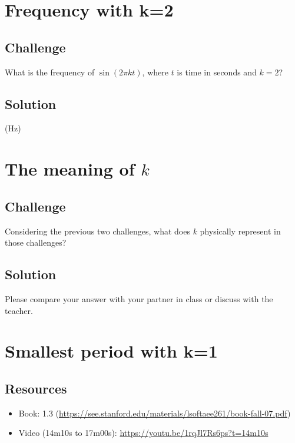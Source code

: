 



\newpage
\section{Frequency with k=2}

\subsection*{Challenge}
What is the frequency of $\sin(2 \pi k t)$, where $t$ is time in seconds and $k=2$?

\subsection*{Solution}
(Hz)





\newpage
\section{The meaning of $k$}

\subsection*{Challenge}
Considering the previous two challenges, what does $k$ physically represent in those challenges?

\subsection*{Solution}
Please compare your answer with your partner in class or discuss with the teacher.




\newpage
\section {Smallest period with k=1}

\subsection*{Resources}
\begin{itemize}
    \item Book: 1.3 (\url{https://see.stanford.edu/materials/lsoftaee261/book-fall-07.pdf})
    \item Video (14m10s to 17m00s): \url{https://youtu.be/1rqJl7Rs6ps?t=14m10s}
\end{itemize}

